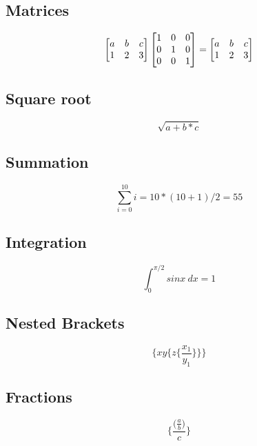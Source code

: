 \documentclass{article}
\begin{document}
    \subsection{Matrices}
        \begin{equation}
            \centering  
            \begin{bmatrix}
            a & b & c \\
            1 & 2 & 3\\
            
            \end{bmatrix}
            \begin{bmatrix}
            1 & 0 & 0 \\
            0 & 1 & 0\\
            0 & 0 & 1\\
            \end{bmatrix}
            =
            \begin{bmatrix}
                a & b & c \\
                1 & 2 & 3\\
            \end{bmatrix}
        \end{equation}
    
    \subsection{Square root}
        $$\sqrt{a+b*c}$$
    
    \subsection{Summation}
        $$\sum_{i=0}^{10}i = 10*(10+1)/2 = 55$$
        
    \subsection{Integration}
        $$\int_0^{\pi/2}sinx~dx = 1$$
    
    \subsection{Nested Brackets}
        \[
           \Bigg\{xy\bigg\{z \Big\{\frac{x_1}{y_1}\Big\}\bigg\}\Bigg\}
        \]
    \subsection{Fractions}
        \[
            \Bigg\{\frac{\bigg(\frac{a}{b}\bigg)}{c}\Bigg\}
        \]
\end{document}
